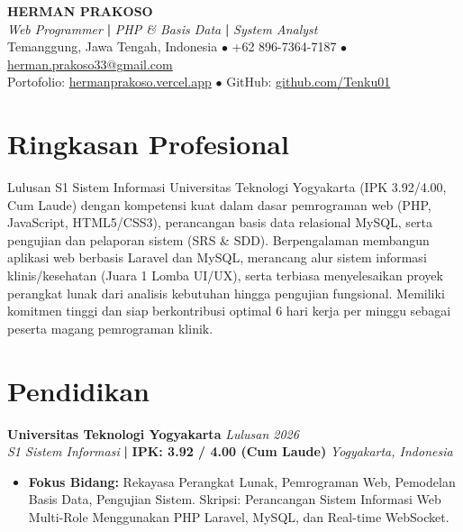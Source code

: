 \documentclass[letterpaper,10pt]{article}
\begin{document}
\begin{center}
  {\LARGE \textbf{HERMAN PRAKOSO}} \\[3pt]
  \textit{Web Programmer} \textbf{|} \textit{PHP \& Basis Data} \textbf{|} \textit{System Analyst} \\[3pt]
  Temanggung, Jawa Tengah, Indonesia $\bullet$ +62 896-7364-7187 $\bullet$ \href{mailto:herman.prakoso33@gmail.com}{herman.prakoso33@gmail.com} \\
  Portofolio: \href{https://hermanprakoso.vercel.app}{hermanprakoso.vercel.app} $\bullet$ GitHub: \href{https://github.com/Tenku01}{github.com/Tenku01}
\end{center}

\vspace{1pt}

\section{Ringkasan Profesional}

Lulusan S1 Sistem Informasi Universitas Teknologi Yogyakarta (IPK 3.92/4.00, Cum Laude) dengan kompetensi kuat dalam dasar pemrograman web (PHP, JavaScript, HTML5/CSS3), perancangan basis data relasional MySQL, serta pengujian dan pelaporan sistem (SRS \& SDD). Berpengalaman membangun aplikasi web berbasis Laravel dan MySQL, merancang alur sistem informasi klinis/kesehatan (Juara 1 Lomba UI/UX), serta terbiasa menyelesaikan proyek perangkat lunak dari analisis kebutuhan hingga pengujian fungsional. Memiliki komitmen tinggi dan siap berkontribusi optimal 6 hari kerja per minggu sebagai peserta magang pemrograman klinik.

\section{Pendidikan}

\noindent
\textbf{Universitas Teknologi Yogyakarta} \hfill \textit{Lulusan 2026} \\
\textit{S1 Sistem Informasi} \textbf{|} \textbf{IPK: 3.92 / 4.00 (Cum Laude)} \hfill \textit{Yogyakarta, Indonesia}
\begin{itemize}
  \item \textbf{Fokus Bidang:} Rekayasa Perangkat Lunak, Pemrograman Web, Pemodelan Basis Data, Pengujian Sistem. Skripsi: Perancangan Sistem Informasi Web Multi-Role Menggunakan PHP Laravel, MySQL, dan Real-time WebSocket.
\end{itemize}
\end{document}
